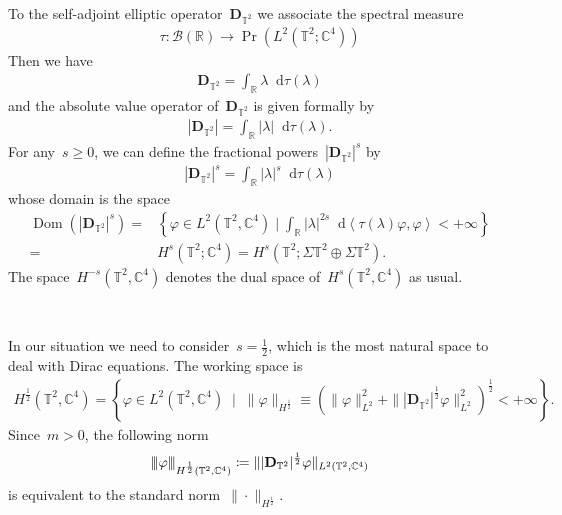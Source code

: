 \documentclass[10pt,a4paper]{amsart}
\newcommand{\tnorm}[1]{%
  \left\vert\kern-0.3ex\left\vert\kern-0.3ex\left\vert #1 \right\vert\kern-0.3ex\right\vert\kern-0.3ex\right\vert
}
\newcommand{\R}{\mathbb{R}}
\newcommand{\C}{\mathbb{C}}
\newcommand{\T}{\mathbb{T}}
\newcommand{\dd}{\mathop{}\!\mathrm{d}}
\newcommand{\pD}{\mathbf{D}}
\newcommand{\Abracket}[1]{\left<#1\right>} %
\newcommand{\parenthesis}[1]{\left(#1\right)} %
\newcommand{\braces}[1]{\left\{#1\right\}} %
\DeclareMathOperator{\Dom}{Dom}
\DeclareMathOperator{\proj}{Pr}
\begin{document}
To the self-adjoint elliptic operator~$\pD_{\T^2}$ we associate the spectral measure
\begin{align}
    \tau\colon \mathcal{B}(\R)\to \proj(L^2(\T^2;\C^4))
\end{align}
Then we have 
\begin{align}
    \pD_{\T^2} = \int_{\R} \lambda \dd\tau(\lambda)
\end{align}
and the absolute value operator of~$\pD_{\T^2}$ is given formally by 
\begin{align}
    |\pD_{\T^2}|=\int_\R |\lambda| \dd\tau(\lambda).
\end{align}
For any~$s\geq 0$, we can define the fractional powers~$|\pD_{\T^2}|^s$ by 
\begin{align}
    |\pD_{\T^2}|^s = \int_{\R} |\lambda|^s \dd\tau(\lambda)
\end{align}
whose domain is the space
\begin{align}
    \Dom(|\pD_{\T^2}|^s)
    =&\braces{ \varphi\in L^2(\T^2,\C^4) \mid \int_\R |\lambda|^{2s} \dd\Abracket{\tau(\lambda)\varphi,\varphi } <+\infty}  \\
    =&H^{s}(\mathbb{T}^2;\C^4) 
    =H^s(\T^2;\Sigma\T^2\oplus\Sigma\T^2).
\end{align}
The space~$H^{-s}(\T^2,\C^4)$ denotes the dual space of~$H^{s}(\T^2,\C^4)$ as usual. 

\ 

In our situation we need to consider~$s=\frac{1}{2}$, which is the most natural space to deal with Dirac equations. 
The working space is 
\begin{align}
    H^{\frac{1}{2}}(\T^2,\C^4)
    =\braces{\varphi\in L^2(\T^2,\C^4) \; \mid \; \|\varphi\|_{H^{\frac{1}{2}}} \equiv \parenthesis{ \|\varphi\|_{L^2}^2 + \| |\pD_{\T^2}|^{\frac{1}{2}} \varphi \|_{L^2}^2 }^{\frac{1}{2}} <+\infty  }. 
\end{align}
Since~$m>0$, the following norm 
\begin{align}
    \tnorm{\varphi}_{H^{\frac{1}{2}}(\T^2,\C^4)}\coloneqq \| |\pD_{\T^2}|^{\frac{1}{2}}\varphi\|_{L^2(\T^2,\C^4)}
\end{align}
is equivalent to the standard norm~$\|\cdot\|_{H^{\frac{1}{2}}}$. 
\end{document}

